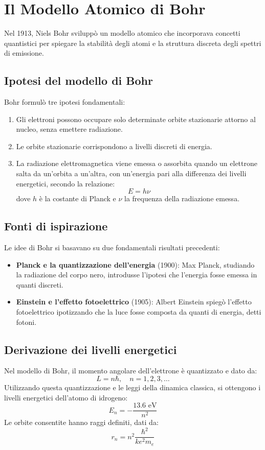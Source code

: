 \section{Il Modello Atomico di Bohr}
Nel 1913, Niels Bohr svilupp\`o un modello atomico che incorporava concetti quantistici per spiegare la stabilit\`a degli atomi e la struttura discreta degli spettri di emissione.

\subsection{Ipotesi del modello di Bohr}
Bohr formul\`o tre ipotesi fondamentali:
\begin{enumerate}
    \item Gli elettroni possono occupare solo determinate orbite stazionarie attorno al nucleo, senza emettere radiazione.
    \item Le orbite stazionarie corrispondono a livelli discreti di energia.
    \item La radiazione elettromagnetica viene emessa o assorbita quando un elettrone salta da un'orbita a un'altra, con un'energia pari alla differenza dei livelli energetici, secondo la relazione:
    \begin{equation}
        E = h\nu
    \end{equation}
    dove $h$ \`e la costante di Planck e $\nu$ la frequenza della radiazione emessa.
\end{enumerate}

\subsection{Fonti di ispirazione}
Le idee di Bohr si basavano su due fondamentali risultati precedenti:
\begin{itemize}
    \item \textbf{Planck e la quantizzazione dell'energia} (1900): Max Planck, studiando la radiazione del corpo nero, introdusse l'ipotesi che l'energia fosse emessa in quanti discreti.
    \item \textbf{Einstein e l'effetto fotoelettrico} (1905): Albert Einstein spieg\`o l'effetto fotoelettrico ipotizzando che la luce fosse composta da quanti di energia, detti fotoni.
\end{itemize}

\subsection{Derivazione dei livelli energetici}
Nel modello di Bohr, il momento angolare dell'elettrone \`e quantizzato e dato da:
\begin{equation}
    L = n\hbar, \quad n = 1, 2, 3, \ldots
\end{equation}
Utilizzando questa quantizzazione e le leggi della dinamica classica, si ottengono i livelli energetici dell'atomo di idrogeno:
\begin{equation}
    E_n = - \frac{13.6 \text{ eV}}{n^2}
\end{equation}
Le orbite consentite hanno raggi definiti, dati da:
\begin{equation}
    r_n = n^2 \frac{\hbar^2}{k e^2 m_e}
\end{equation}

